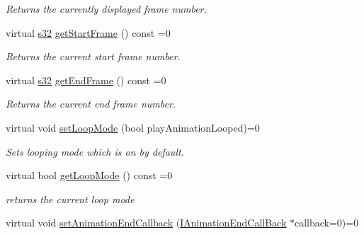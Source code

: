 \begin{DoxyCompactItemize}
\begin{DoxyCompactList}\small\item\em Returns the currently displayed frame number. \end{DoxyCompactList}\item 
\mbox{\label{classirr_1_1scene_1_1IAnimatedMeshSceneNode_a103022e7383241ea5f1ed76c2deacc69}} 
virtual \hyperlink{namespaceirr_ac66849b7a6ed16e30ebede579f9b47c6}{s32} \hyperlink{classirr_1_1scene_1_1IAnimatedMeshSceneNode_a103022e7383241ea5f1ed76c2deacc69}{get\+Start\+Frame} () const =0
\begin{DoxyCompactList}\small\item\em Returns the current start frame number. \end{DoxyCompactList}\item 
\mbox{\label{classirr_1_1scene_1_1IAnimatedMeshSceneNode_a8c4f524c00b520e870881ca7abfdce5a}} 
virtual \hyperlink{namespaceirr_ac66849b7a6ed16e30ebede579f9b47c6}{s32} \hyperlink{classirr_1_1scene_1_1IAnimatedMeshSceneNode_a8c4f524c00b520e870881ca7abfdce5a}{get\+End\+Frame} () const =0
\begin{DoxyCompactList}\small\item\em Returns the current end frame number. \end{DoxyCompactList}\item 
virtual void \hyperlink{classirr_1_1scene_1_1IAnimatedMeshSceneNode_ae6cae051c74c3953061aa9e49e10cd06}{set\+Loop\+Mode} (bool play\+Animation\+Looped)=0
\begin{DoxyCompactList}\small\item\em Sets looping mode which is on by default. \end{DoxyCompactList}\item 
virtual bool \hyperlink{classirr_1_1scene_1_1IAnimatedMeshSceneNode_a3271dc33b1911d637b05c58f17398a0a}{get\+Loop\+Mode} () const =0
\begin{DoxyCompactList}\small\item\em returns the current loop mode \end{DoxyCompactList}\item 
virtual void \hyperlink{classirr_1_1scene_1_1IAnimatedMeshSceneNode_ad688bb5a7654116d1ee823e48393f1bd}{set\+Animation\+End\+Callback} (\hyperlink{classirr_1_1scene_1_1IAnimationEndCallBack}{I\+Animation\+End\+Call\+Back} $\ast$callback=0)=0

\end{DoxyCompactItemize}

